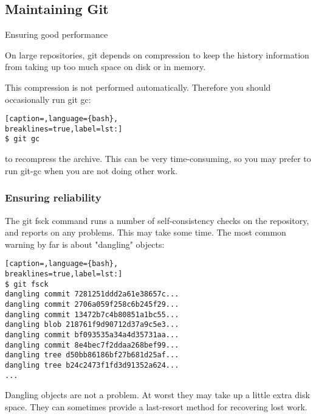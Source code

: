\subsection{Maintaining Git}
Ensuring good performance

On large repositories, git depends on compression to keep the history
information from taking up too much space on disk or in memory.

This compression is not performed automatically. Therefore you should
occasionally run git gc:
\lstset{basicstyle=\scriptsize, numbers=none, captionpos=b, tabsize=4}
\begin{lstlisting}[caption=,language={bash},
breaklines=true,label=lst:]
$ git gc
\end{lstlisting}

to recompress the archive. This can be very time-consuming, so you may prefer
to run git-gc when you are not doing other work.

\subsubsection{Ensuring reliability}
The git fsck command runs a number of self-consistency checks on the
repository, and reports on any problems. This may take some time. The most
common warning by far is about "dangling" objects:
\lstset{basicstyle=\scriptsize, numbers=none, captionpos=b, tabsize=4}
\begin{lstlisting}[caption=,language={bash},
breaklines=true,label=lst:]
$ git fsck
dangling commit 7281251ddd2a61e38657c...
dangling commit 2706a059f258c6b245f29...
dangling commit 13472b7c4b80851a1bc55...
dangling blob 218761f9d90712d37a9c5e3...
dangling commit bf093535a34a4d35731aa...
dangling commit 8e4bec7f2ddaa268bef99...
dangling tree d50bb86186bf27b681d25af...
dangling tree b24c2473f1fd3d91352a624...
...
\end{lstlisting}

Dangling objects are not a problem. At worst they may take up a little extra
disk space. They can sometimes provide a last-resort method for recovering lost
work.
